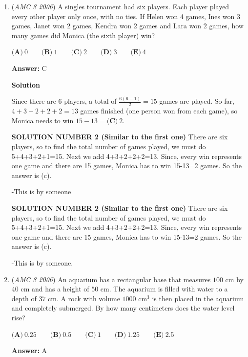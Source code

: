 \begin{enumerate}
 


	\item (\textit{AMC 8 2006}) A singles tournament had six players. Each player played every other player only once, with no ties. If Helen won 4 games, Ines won 3 games, Janet won 2 games, Kendra won 2 games and Lara won 2 games, how many games did Monica (the sixth player) win? 


 $\textbf{(A)}\ 0\qquad\textbf{(B)}\ 1\qquad\textbf{(C)}\ 2\qquad\textbf{(D)}\ 3\qquad\textbf{(E)}\ 4$

 \textbf{Answer: }C



\textbf{Solution}

Since there are 6 players, a total of $\frac{6(6-1)}{2}=15$ games are played. So far, $4+3+2+2+2=13$ games finished (one person won from each game), so Monica needs to win $15-13 = \boxed{\textbf{(C)}\ 2}$.

 


 


 


 \textbf{SOLUTION NUMBER 2 (Similar to the first one)} There are six players, so to find the total number of games played, we must do 5+4+3+2+1=15. Next we add 4+3+2+2+2=13. Since, every win represents one game and there are 15 games, Monica has to win 15-13=2 games. So the answer is (c).

 -This is by someone

 \textbf{SOLUTION NUMBER 2 (Similar to the first one)} There are six players, so to find the total number of games played, we must do 5+4+3+2+1=15. Next we add 4+3+2+2+2=13. Since, every win represents one game and there are 15 games, Monica has to win 15-13=2 games. So the answer is (c).

 -This is by someone.

 


	\item (\textit{AMC 8 2006}) An aquarium has a rectangular base that measures $100$ cm by $40$ cm and has a height of $50$ cm. The aquarium is filled with water to a depth of $37$ cm. A rock with volume $1000 \text{ cm}^3$ is then placed in the aquarium and completely submerged. By how many centimeters does the water level rise? 


 $\textbf{(A)}\ 0.25\qquad\textbf{(B)}\ 0.5\qquad\textbf{(C)}\ 1\qquad\textbf{(D)}\ 1.25\qquad\textbf{(E)}\ 2.5$

 \textbf{Answer: }A




\end{enumerate}
